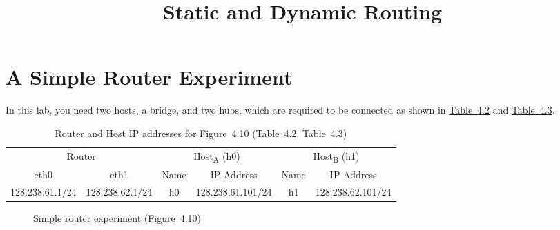 \documentclass{../UTNetLab}
\title{Static and Dynamic Routing}
\begin{document}
\part{A Simple Router Experiment}
In this lab, you need two hosts, a bridge, and two hubs, which are required to be connected as shown in \hyperref[tab:4.2]{Table~4.2} and \hyperref[tab:4.3]{Table~4.3}.
\begin{table}[H]
    \caption{Router and Host IP addresses for \hyperref[fig:4.10]{Figure~4.10} (Table~4.2\label{tab:4.2}, Table~4.3\label{tab:4.3})}
    \centering
    \begin{tabular}{ *2c | *2c | *2c }
        \hline \hline
        \multicolumn{2}{c|}{Router} & \multicolumn{2}{c|}{Host\textsubscript{A} (h0)} & \multicolumn{2}{c}{Host\textsubscript{B} (h1)}                                                \\
        eth0                        & eth1                                            & Name                                           & IP Address        & Name & IP Address        \\
        \hline
        128.238.61.1/24             & 128.238.62.1/24                                 & h0                                             & 128.238.61.101/24 & h1   & 128.238.62.101/24 \\
        \hline \hline
    \end{tabular}
\end{table}

\begin{figure}[H]
    \centering
    \caption{Simple router experiment (Figure~4.10)}\label{fig:4.10}
\end{figure}
\end{document}
